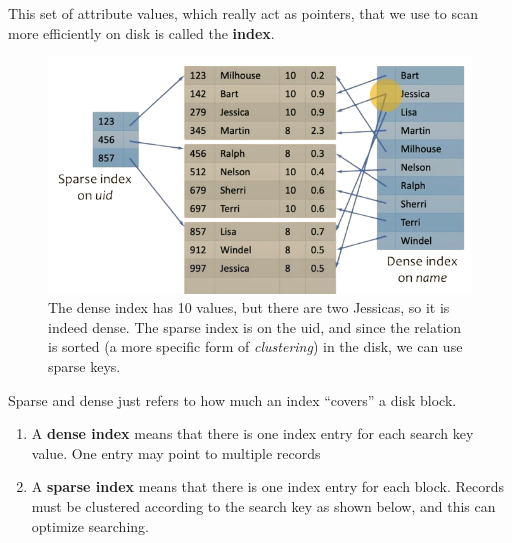 \documentclass{article}
\begin{document}
    \begin{definition}[Index]
      This set of attribute values, which really act as pointers, that we use to scan more efficiently on disk is called the \textbf{index}. 

      \begin{figure}[H]
        \centering 
        \includegraphics[scale=0.4]{img/dense_sparse.png}
        \caption{The dense index has 10 values, but there are two Jessicas, so it is indeed dense. The sparse index is on the uid, and since the relation is sorted (a more specific form of \textit{clustering}) in the disk, we can use sparse keys.} 
        \label{fig:dense_sparse}
      \end{figure}

      Sparse and dense just refers to how much an index ``covers'' a disk block. 
      \begin{enumerate}
        \item A \textbf{dense index} means that there is one index entry for each search key value. One entry may point to multiple records
        \item A \textbf{sparse index} means that there is one index entry for each block. Records must be clustered according to the search key as shown below, and this can optimize searching. 
      \end{enumerate}


\end{definition}
\end{document}
